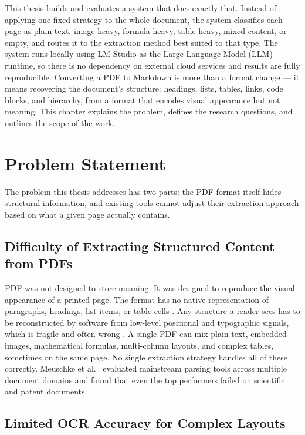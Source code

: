 This thesis builds and evaluates a system that does exactly that. Instead of
applying one fixed strategy to the whole document, the system classifies each
page as plain text, image-heavy, formula-heavy, table-heavy, mixed content, or
empty, and routes it to the extraction method best suited to that type. The system runs locally using LM Studio as the Large Language Model (LLM)
runtime, so there is no dependency on external cloud services and results are
fully reproducible. Converting a PDF to Markdown is more than a format change ---
it means recovering the document's structure: headings, lists, tables, links,
code blocks, and hierarchy, from a format that encodes visual appearance but not
meaning. This chapter explains the problem, defines the research questions, and
outlines the scope of the work.

\section{Problem Statement}

The problem this thesis addresses has two parts: the PDF format itself hides
structural information, and existing tools cannot adjust their extraction
approach based on what a given page actually contains.

\subsection{Difficulty of Extracting Structured Content from PDFs}

PDF was not designed to store meaning. It was designed to reproduce the
visual appearance of a printed page. The format has no native representation
of paragraphs, headings, list items, or table cells \autocite{whitington2012}.
Any structure a reader sees has to be reconstructed by software from
low-level positional and typographic signals, which is fragile and often
wrong \autocite{zhu2022}. A single PDF can mix plain text, embedded images,
mathematical formulas, multi-column layouts, and complex tables, sometimes
on the same page. No single extraction strategy handles all of these
correctly. Meuschke et al.\ \autocite{meuschke2023} evaluated mainstream parsing
tools across multiple document domains and found that even the top performers
failed on scientific and patent documents.

\subsection{Limited OCR Accuracy for Complex Layouts}

